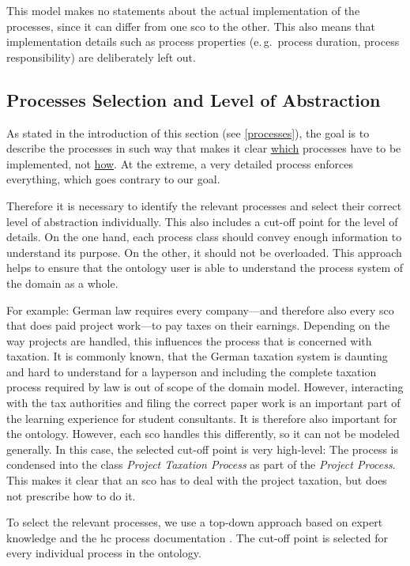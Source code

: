 \documentclass[a4paper, DIV=13, BCOR=0cm]{scrbook}
\newcommand{\eg}{e.\,g.\ }
\begin{document}
This model makes no statements about the actual implementation of the processes, since it can differ from one \gls{sco} to the other. This also means that implementation details such as process properties (\eg process duration, process responsibility) are deliberately left out.

\subsection{Processes Selection and Level of Abstraction}
As stated in the introduction of this section (see \ref{processes}), the goal is to describe the processes in such way that makes it clear \underline{which} processes have to be implemented, not \underline{how}. At the extreme, a very detailed process enforces everything, which goes contrary to our goal.

Therefore it is necessary to identify the relevant processes and select their correct level of abstraction individually. This also includes a cut-off point for the level of details.  On the one hand, each process class should convey enough information to understand its purpose. On the other, it should not be overloaded. This approach helps to ensure that the ontology user is able to understand the process system of the domain as a whole.

For example: German law requires every company---and therefore also every \gls{sco} that does paid project work---to pay taxes on their earnings. Depending on the way projects are handled, this influences the process that is concerned with taxation. It is commonly known, that the German taxation system is daunting and hard to understand for a layperson and including the complete taxation process required by law is out of scope of the domain model. However, interacting with the tax authorities and filing the correct paper work is an important part of the learning experience for student consultants. It is therefore also important for the ontology. However, each \gls{sco} handles this differently, so it can not be modeled generally. In this case, the selected cut-off point is very high-level: The process is condensed into the class \textit{Project Taxation Process} as part of the \textit{Project Process}. This makes it clear that an \gls{sco} has to deal with the project taxation, but does not prescribe how to do it.

To select the relevant processes, we use a top-down approach based on expert knowledge and the \gls{hc} process documentation \cite{hc-prozesshandbuch}. The cut-off point is selected for every individual process in the ontology.
\end{document}
